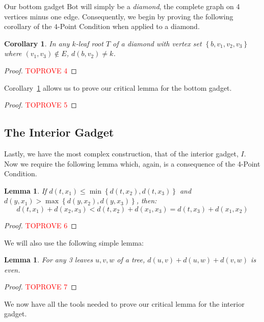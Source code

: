 \documentclass[11pt,letter]{article}
\newtheorem{lemma}[theorem]{Lemma}
\newtheorem{corollary}[theorem]{Corollary}
\theoremstyle{remark}
\newcommand{\B}{\text{Bot}}
\newcommand{\set}[1]{\left\{#1\right\}}
\begin{document}
Our bottom gadget $\B$ will simply be a {\em diamond}, the complete graph on 4 vertices minus one edge.
Consequently, we begin by proving the following corollary of the $4$-Point Condition when applied to a diamond.

\begin{corollary}\label{cor:diamond}
    In any $k$-leaf root $T$ of a diamond with vertex set $\set{b,v_1,v_2,v_3}$ where $(v_1,v_3)\notin E$, $d(b,v_2)\neq k$.
\end{corollary}

\begin{proof}\textcolor{red}{TOPROVE 4}\end{proof}

Corollary~\ref{cor:diamond} allows us to prove our critical lemma for the bottom gadget.

\bot*

\begin{proof}\textcolor{red}{TOPROVE 5}\end{proof}



\subsection{The Interior Gadget}\label{sec:int}

Lastly, we have the most complex construction, that of 
the interior gadget, $I$. 
Now we require the following lemma which, again, is a consequence of the 4-Point Condition.

\begin{lemma}\label{lem:closer}
    If $d(t,x_1)\leq \min\set{d(t,x_2),d(t,x_3)}$ and $d(y,x_1)>\max\set{d(y,x_2),d(y,x_3)}$, then:
    \[d(t,x_1)+d(x_2,x_3)<d(t,x_2)+d(x_1,x_3)=d(t,x_3)+d(x_1,x_2)\]
\end{lemma}

\begin{proof}\textcolor{red}{TOPROVE 6}\end{proof}

We will also use the following simple lemma:

\begin{lemma}\label{lem:even}
    For any 3 leaves $u,v,w$ of a tree, $d(u,v)+d(u,w)+d(v,w)$ is even.
\end{lemma}

\begin{proof}\textcolor{red}{TOPROVE 7}\end{proof}

We now have all the tools needed to prove our critical lemma for the interior gadget.
\end{document}
